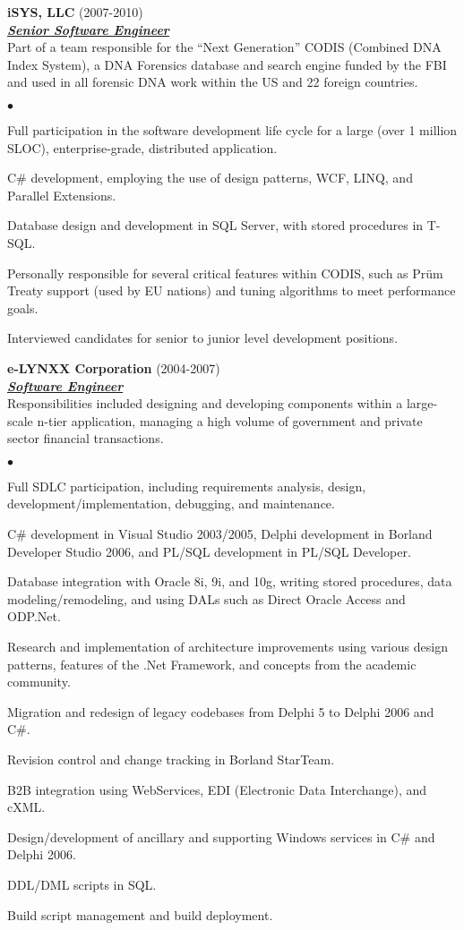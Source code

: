 \documentclass{article}
\newcommand{\employer}[3]{{ \textbf{#1} (#2)\\ \underline{\textbf{\emph{#3}}}\\  }}
\newenvironment{achievements}{\begin{list}{$\bullet$}{\topsep 0pt \itemsep
      -2pt}}{\vspace*{4pt}\end{list}}
\begin{document}
\employer{iSYS, LLC}{2007-2010}{Senior Software Engineer} Part of a team
responsible for the ``Next Generation'' CODIS (Combined DNA Index System), a
DNA Forensics database and search engine funded by the FBI and used in all
forensic DNA work within the US and 22 foreign countries.
\begin{achievements}
\item Full participation in the software development life cycle for a large
  (over 1 million SLOC), enterprise-grade, distributed application.
\item C\# development, employing the use of design patterns, WCF, LINQ, and
  Parallel Extensions.
\item Database design and development in SQL Server, with stored procedures in
  T-SQL.
\item Personally responsible for several critical features within CODIS, such
  as Pr\"um Treaty support (used by EU nations) and tuning algorithms to meet
  performance goals.
\item Interviewed candidates for senior to junior level development positions.
\end{achievements}

\employer{e-LYNXX Corporation}{2004-2007}{Software Engineer} Responsibilities
included designing and developing components within a large-scale n-tier
application, managing a high volume of government and private sector financial
transactions.
\begin{achievements}
\item Full SDLC participation, including requirements analysis, design,
  development/implementation, debugging, and maintenance.
\item C\# development in Visual Studio 2003/2005, Delphi development in Borland
  Developer Studio 2006, and PL/SQL development in PL/SQL Developer.
\item Database integration with Oracle 8i, 9i, and 10g, writing stored
  procedures, data modeling/remodeling, and using DALs such as Direct Oracle
  Access and ODP.Net.
\item Research and implementation of architecture improvements using various
  design patterns, features of the .Net Framework, and concepts from the
  academic community.
\item Migration and redesign of legacy codebases from Delphi 5 to Delphi 2006
  and C\#.
\item Revision control and change tracking in Borland StarTeam.
\item B2B integration using WebServices, EDI (Electronic Data Interchange), and
  cXML.
\item Design/development of ancillary and supporting Windows services in C\# and
  Delphi 2006.
\item DDL/DML scripts in SQL.
\item Build script management and build deployment.
\end{achievements}
\end{document}
